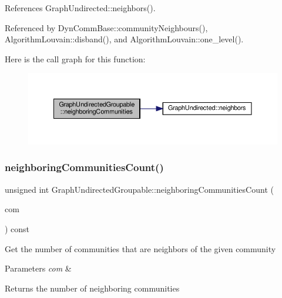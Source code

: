 References Graph\+Undirected\+::neighbors().



Referenced by Dyn\+Comm\+Base\+::community\+Neighbours(), Algorithm\+Louvain\+::disband(), and Algorithm\+Louvain\+::one\+\_\+level().

Here is the call graph for this function\+:
\nopagebreak
\begin{figure}[H]
\begin{center}
\leavevmode
\includegraphics[width=350pt]{classGraphUndirectedGroupable_a248d992baca0755467a2eaea96fe3654_cgraph}
\end{center}
\end{figure}
\mbox{\label{classGraphUndirectedGroupable_a6f6c8b41ca143f9d2ef7e0f267da6b9e}} 
\subsubsection{\texorpdfstring{neighboring\+Communities\+Count()}{neighboringCommunitiesCount()}}
{\footnotesize\ttfamily unsigned int Graph\+Undirected\+Groupable\+::neighboring\+Communities\+Count (\begin{DoxyParamCaption}\item[{const \hyperlink{graphUndirectedGroupable_8h_a914da95c9ea7f14f4b7f875c36818556}{type\+Community} \&}]{com }\end{DoxyParamCaption}) const\hspace{0.3cm}{\ttfamily [inline]}}

Get the number of communities that are neighbors of the given community


\begin{DoxyParams}{Parameters}
{\em com} & \\
\hline
\end{DoxyParams}
\begin{DoxyReturn}{Returns}
the number of neighboring communities 
\end{DoxyReturn}



